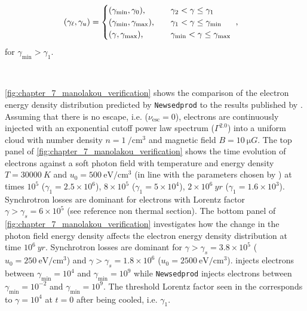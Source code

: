 \begin{equation}
    \begin{aligned}
  	  \qty(\gamma_\ell,\gamma_u)&=
  	  \begin{cases}
  		  \qty(\gamma_\text{min},\gamma_0)\text{,}\quad & \gamma_2<\gamma\leq\gamma_1 \\
   		 \qty(\gamma_\text{min},\gamma_\text{max})\text{,}\quad & \gamma_1<\gamma\leq\gamma_\text{min} \\
   		 \qty(\gamma,\gamma_\text{max})\text{,}\quad & \gamma_\text{min}<\gamma\leq\gamma_\text{max}
    	\end{cases}\text{ ,}
    \end{aligned}
\end{equation}
\noindent for $\gamma_\text{min}>\gamma_1$.
\par~\par
\autoref{fig:chapter_7_manolakou_verification} shows the comparison of the electron energy density distribution predicted by {\tt Newsedprod} to the results published by \cite{2007A&A...474..689M}. Assuming that there is no escape, i.e. ($\nu_\text{esc}=0$), electrons are continuously injected with an exponential cutoff power law spectrum ($\Gamma^{2.0}$) into a uniform cloud with number density $n=1~\si{\per\centi\meter\cubed}$ and magnetic field $B=10~\si{\micro G}$. The top panel of \autoref{fig:chapter_7_manolakou_verification} shows the time evolution of electrons against a soft photon field with temperature and energy density $T=30000~\si{K}$ and $u_0=500~\si{\electronvolt\per\centi\meter\cubed}$ (in line with the parameters chosen by \cite{2007A&A...474..689M}) at times $10^5$ ($\gamma_1=2.5\times 10^6$), $8\times 10^5$ ($\gamma_1=5\times 10^4$), $2\times 10^6~\si{yr}$ ($\gamma_1=1.6\times 10^3$). Synchrotron losses are dominant for electrons with Lorentz factor $\gamma>\gamma_s = 6\times 10^5$ (see reference non thermal section). The bottom panel of \autoref{fig:chapter_7_manolakou_verification} investigates how the change in the photon field energy density affects the electron energy density distribution at time $10^6~\si{yr}$. Synchrotron losses are dominant for $\gamma>\gamma_s=3.8\times 10^5$ ($u_0=250~\si{\electronvolt\per\centi\meter\cubed}$) and $\gamma>\gamma_s=1.8\times 10^6$ ($u_0=2500~\si{\electronvolt\per\centi\meter\cubed}$).  \cite{2007A&A...474..689M} injects electrons between $\gamma_\text{min}=10^4$ and $\gamma_\text{min}=10^9$ while {\tt Newsedprod} injects electrons between $\gamma_\text{min}=10^{-2}$ and $\gamma_\text{min}=10^9$. The threshold Lorentz factor seen in the \cite{2007A&A...474..689M} corresponds to $\gamma=10^4$ at $t=0$ after being cooled, i.e. $\gamma_1$.

